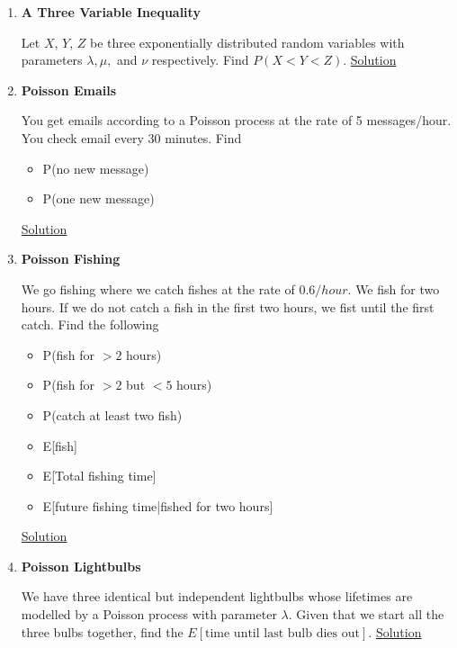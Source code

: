 \documentclass[11pt, a4paper]{article}
\begin{document}
\begin{enumerate}
    
    \item \hypertarget{q_threevar}{\textbf{A Three Variable Inequality}} \newline
    Let $X$, $Y$, $Z$ be three exponentially distributed random variables with parameters $\lambda, \mu,$ and $\nu$ respectively. Find $P(X < Y < Z)$. \hyperlink{a_threevar}{Solution}


    \item \hypertarget{q_poissonemails}{\textbf{Poisson Emails}}\newline
    You get emails according to a Poisson process at the rate of 5 messages/hour. You check email every 30 minutes. Find
    \begin{itemize}
        \item P(no new message)
        \item P(one new message)
    \end{itemize}
    \hyperlink{a_poissonemails}{Solution}

    \item \hypertarget{q_poissonfish}{\textbf{Poisson Fishing}}\newline
    We go fishing where we catch fishes at the rate of $0.6/hour$. We fish for two hours. If we do not catch a fish in the first two hours, we fist until the first catch. Find the following
    \begin{itemize}
        \item P(fish for $> 2$ hours)
        \item P(fish for $> 2$ but $< 5$ hours)
        \item P(catch at least two fish)
        \item E[fish]
        \item E[Total fishing time]
        \item E[future fishing time|fished for two hours]
    \end{itemize}
    \hyperlink{a_poissonfish}{Solution}

    \item \hypertarget{q_poissonbulb}{\textbf{Poisson Lightbulbs}}\newline
    We have three identical but independent lightbulbs whose lifetimes are modelled by a Poisson process with parameter $\lambda$. Given that we start all the three bulbs together, find the $E[\text{time until last bulb dies out}]$. \hyperlink{a_poissonbulb}{Solution}


\end{enumerate}
\end{document}
